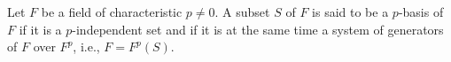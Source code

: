 Let $F$ be a field of characteristic $p \neq 0$. A subset $S$ of $F$ is said to be a $p$-basis of $F$ if it is a $p$-independent set and if it is at the same time a system of generators of $F$ over $F^p$, i.e., $F = F^p(S)$.
